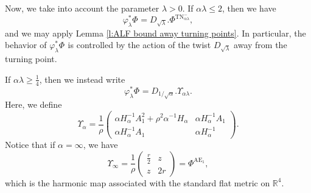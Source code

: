 \documentclass[a4paper,11pt]{amsart}
\theoremstyle{definition}
\numberwithin{equation}{section}
\DeclareMathOperator{\Ae}{AE}
\DeclareMathOperator{\TN}{TN}
\DeclareMathOperator{\TNam}{TN^{--}_\alpha}
\begin{document}
Now, we take into account the parameter \( \lambda>0 \).  If \( \alpha \lambda \leq 2 \), then we have  
\begin{equation}\label{e:scaling ALF model}
    \varphi_\lambda^*\Phi^{\TNam} = D_{\sqrt{\lambda}}. \Phi^{\TN^-_{\alpha\lambda}},
\end{equation}
and we may apply Lemma \ref{l:ALF bound away turning points}. In particular, the behavior of \( \varphi_\lambda^*\Phi^{\TNam} \) is controlled by the action of the twist \( D_{\sqrt{\lambda}} \) away from the turning point.  

If \( \alpha\lambda \geq \frac{1}{4} \), then we instead write  
\begin{equation}
    \varphi_\lambda^*\Phi^{\TNam} = D_{{1}/{\sqrt{\alpha}}}. \Upsilon_{\alpha\lambda}.
\end{equation}
Here, we define  
\begin{equation}
    \Upsilon_{\alpha} = \frac{1}{\rho} \begin{pmatrix}
        \alpha H_\alpha^{-1} A_1^2 + \rho^2 \alpha^{-1} H_\alpha & \alpha H_\alpha^{-1} A_1 \\
        \alpha H_\alpha^{-1} A_1 & \alpha H_\alpha^{-1}
    \end{pmatrix}.
\end{equation}
Notice that if \( \alpha = \infty \), we have  
\begin{equation}
    \Upsilon_{\infty} = \frac{1}{\rho} \begin{pmatrix}
        \frac{r}{2} & z \\
        z & 2r
    \end{pmatrix} = \Phi^{\Ae_1},
\end{equation}
which is the  harmonic map associated with the standard flat metric on \( \mathbb{R}^4 \).  
\end{document}
